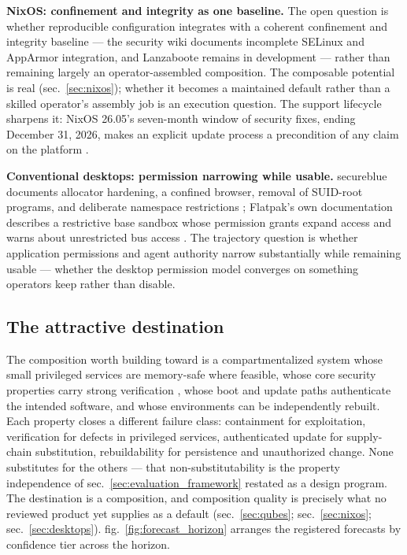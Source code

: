 \documentclass[
  english,
  9pt,
]{extarticle}
\begin{document}
\textbf{NixOS: confinement and integrity as one baseline.} The open
question is whether reproducible configuration integrates with a
coherent confinement and integrity baseline --- the security wiki
documents incomplete SELinux and AppArmor integration, and Lanzaboote
remains in development
\citep{nixos_security_wiki, nixos_lanzaboote_wiki} --- rather than
remaining largely an operator-assembled composition. The composable
potential is real (sec.~\ref{sec:nixos}); whether it becomes a
maintained default rather than a skilled operator's assembly job is an
execution question. The support lifecycle sharpens it: NixOS 26.05's
seven-month window of security fixes, ending December 31, 2026, makes an
explicit update process a precondition of any claim on the platform
\citep{nixos_2605_announcement}.

\textbf{Conventional desktops: permission narrowing while usable.}
secureblue documents allocator hardening, a confined browser, removal of
SUID-root programs, and deliberate namespace restrictions
\citep{secureblue_features}; Flatpak's own documentation describes a
restrictive base sandbox whose permission grants expand access and warns
about unrestricted bus access \citep{flatpak_permissions}. The
trajectory question is whether application permissions and agent
authority narrow substantially while remaining usable --- whether the
desktop permission model converges on something operators keep rather
than disable.

\subsection{The attractive
destination}\label{the-attractive-destination}

The composition worth building toward is a compartmentalized system
whose small privileged services are memory-safe where feasible, whose
core security properties carry strong verification \citep{klein2009},
whose boot and update paths authenticate the intended software, and
whose environments can be independently rebuilt. Each property closes a
different failure class: containment for exploitation, verification for
defects in privileged services, authenticated update for supply-chain
substitution, rebuildability for persistence and unauthorized change.
None substitutes for the others --- that non-substitutability is the
property independence of sec.~\ref{sec:evaluation_framework} restated as
a design program. The destination is a composition, and composition
quality is precisely what no reviewed product yet supplies as a default
(sec.~\ref{sec:qubes}; sec.~\ref{sec:nixos}; sec.~\ref{sec:desktops}).
fig.~\ref{fig:forecast_horizon} arranges the registered forecasts by
confidence tier across the horizon.
\end{document}
